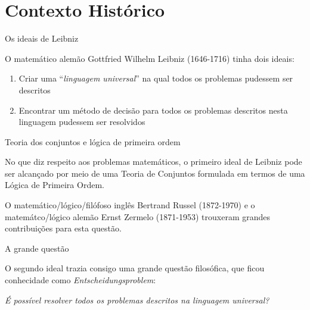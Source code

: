 \section{Contexto Histórico}

\begin{frame}[fragile]{Os ideais de Leibniz}

    O matemático alemão Gottfried Wilhelm Leibniz (1646-1716) tinha dois ideais:

    \vspace{0.2in}

    \begin{enumerate}
        \item Criar uma ``\textit{linguagem universal}'' na qual todos os problemas pudessem
            ser descritos
        \item Encontrar um método de decisão para todos os problemas descritos nesta linguagem
            pudessem ser resolvidos
    \end{enumerate}

\end{frame}

\begin{frame}[fragile]{Teoria dos conjuntos e lógica de primeira ordem}

    No que diz respeito aos problemas matemáticos, o primeiro ideal de Leibniz pode ser alcançado       por meio de uma Teoria de Conjuntos formulada em termos de uma Lógica de Primeira Ordem. 

    \vspace{0.2in}

    O matemático/lógico/filófoso inglês Bertrand Russel (1872-1970) e o matemátco/lógico alemão
    Ernst Zermelo (1871-1953) trouxeram grandes contribuições para esta questão.

\end{frame}

\begin{frame}[fragile]{A grande questão}

    O segundo ideal trazia consigo uma grande questão filosófica, que ficou conhecidade como
    \textit{Entscheidungsproblem}:

    \vspace{0.2in}
    \begin{center}
        {\it \Large É possível resolver todos os problemas descritos na linguagem universal?}
    \end{center}

\end{frame}

